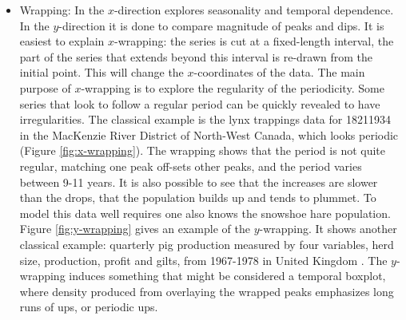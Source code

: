 \documentclass[12pt]{article}
\begin{document}
\begin{itemize} \itemsep 0in
\item Wrapping: In the $x$-direction explores seasonality and
  temporal dependence.  In the $y$-direction it is done to compare
  magnitude of peaks and dips. It is easiest to explain $x$-wrapping:
  the series is cut at a fixed-length interval, the part of the series
  that extends beyond this interval is re-drawn from the initial
  point. This will change the $x$-coordinates of the data. The main
  purpose of $x$-wrapping is to explore the regularity of the
  periodicity. Some series that look to follow a regular period can be
  quickly revealed to have irregularities. The classical example is
  the lynx trappings data for 1821\textendash{}1934 in the MacKenzie
  River District of North-West Canada\citep{campbell1977survey}, which
  looks periodic (Figure \ref{fig:x-wrapping}). The wrapping shows
  that the period is not quite regular, matching one peak off-sets
  other peaks, and the period varies between 9-11 years. It is also
  possible to see that the increases are slower than the drops, that
  the population builds up and tends to plummet. To model this data
  well requires one also knows the snowshoe hare population. Figure
  \ref{fig:y-wrapping} gives an example of the $y$-wrapping. It
  shows another classical example: quarterly pig production measured
  by four variables, herd size, production, profit and gilts, from
  1967-1978 in United Kingdom \citep{andrews1985data}. The $y$-wrapping
  induces something that might be considered a temporal boxplot, where
  density produced from overlaying the wrapped peaks emphasizes long
  runs of ups, or periodic ups.

\end{itemize}
\end{document}
